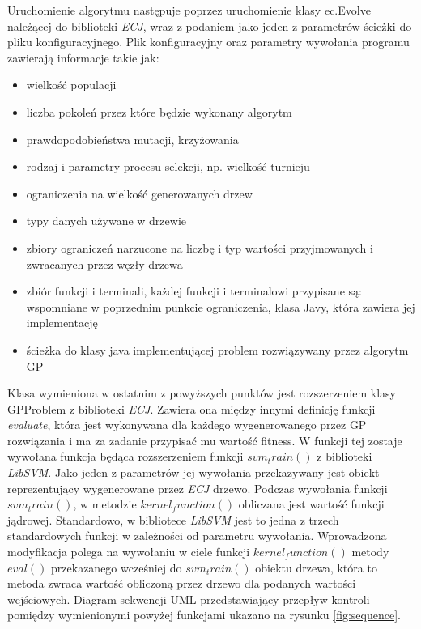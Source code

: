 Uruchomienie algorytmu następuje poprzez uruchomienie klasy ec.Evolve należącej do biblioteki \emph{ECJ}, wraz z podaniem jako jeden z parametrów ścieżki do pliku konfiguracyjnego.
Plik konfiguracyjny oraz parametry wywołania programu zawierają informacje takie jak:
\begin{itemize}
	\item wielkość populacji
	\item liczba pokoleń przez które będzie wykonany algorytm
	\item prawdopodobieństwa mutacji, krzyżowania
	\item rodzaj i parametry procesu selekcji, np. wielkość turnieju
	\item ograniczenia na wielkość generowanych drzew
	\item typy danych używane w drzewie
	\item zbiory ograniczeń narzucone na liczbę i typ wartości przyjmowanych i zwracanych przez węzły drzewa
	\item zbiór funkcji i terminali, każdej funkcji i terminalowi przypisane są: wspomniane w poprzednim punkcie ograniczenia, klasa Javy, która zawiera jej implementację
	\item ścieżka do klasy java implementującej problem rozwiązywany przez algorytm GP
\end{itemize}

Klasa wymieniona w ostatnim z powyższych punktów jest rozszerzeniem klasy GPProblem z biblioteki \emph{ECJ}. 
Zawiera ona między innymi definicję funkcji \emph{evaluate}, która  jest wykonywana dla każdego wygenerowanego przez GP rozwiązania i ma za zadanie przypisać mu wartość fitness. W funkcji tej zostaje wywołana funkcja będąca rozszerzeniem funkcji $ svm_train() $ z biblioteki \emph{LibSVM}. 
Jako jeden z parametrów jej wywołania przekazywany jest obiekt reprezentujący wygenerowane przez \emph{ECJ} drzewo. 
Podczas wywołania funkcji $ svm_train() $, w metodzie $ kernel_function() $ obliczana jest wartość funkcji jądrowej. Standardowo, w bibliotece \emph{LibSVM} jest to jedna z trzech standardowych funkcji w zależności od parametru wywołania. 
Wprowadzona modyfikacja polega na wywołaniu w ciele funkcji $ kernel_function() $ metody $ eval() $ przekazanego wcześniej do $ svm_train() $ obiektu drzewa, która to metoda zwraca wartość obliczoną przez drzewo dla podanych wartości wejściowych.
Diagram sekwencji UML przedstawiający przepływ kontroli pomiędzy wymienionymi powyżej funkcjami ukazano na rysunku \ref{fig:sequence}.

